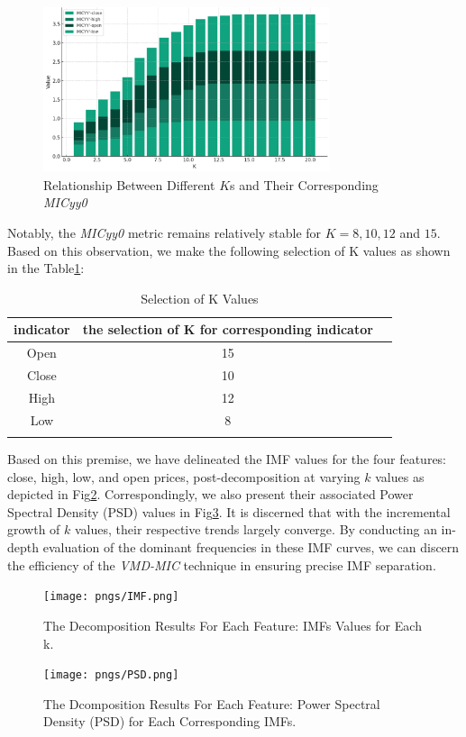 \documentclass[sn-mathphys,Numbered]{sn-jnl}
\theoremstyle{thmstyleone}%
\theoremstyle{thmstyletwo}%
\theoremstyle{thmstylethree}%
\begin{document}
\begin{figure}[h]
    \centering
    \includegraphics[width=0.75\textwidth]{pngs/MICYY.png}
    \caption{ Relationship Between Different $K$s and Their Corresponding \textit{MICyy0}}
    \label{MICYY}
\end{figure}


Notably, the \textit{MICyy0} metric remains relatively stable for \( K = 8, 10, 12 \) and \( 15 \). Based on this observation, we make the following selection of K values as shown in the Table\ref{tab_3}:

\begin{table}[h]
\caption{Selection of K Values}\label{tab_3}%
\begin{tabular}{@{}ccc@{}}
\toprule
indicator & the selection of K for corresponding indicator  \\
\midrule
Open      & 15    \\
Close    & 10    \\
High        & 12    \\
Low      & 8    \\
\botrule
\end{tabular}
\end{table}


Based on this premise, we have delineated the IMF values for the four features: close, high, low, and open prices, post-decomposition at varying \( k \) values as depicted in Fig\ref{IMF}. Correspondingly, we also present their associated Power Spectral Density (PSD) values in Fig\ref{PSD}. It is discerned that with the incremental growth of \( k \) values, their respective trends largely converge. By conducting an in-depth evaluation of the dominant frequencies in these IMF curves, we can discern the efficiency of the \textit{VMD-MIC} technique in ensuring precise IMF separation.

\begin{figure}[h]
    \centering
    \texttt{[image: pngs/IMF.png]}
    \caption{ The Decomposition Results For Each Feature: IMFs Values for Each k.}
    \label{IMF}
\end{figure}
\begin{figure}[h]
    \centering
    \texttt{[image: pngs/PSD.png]}
    \caption{ The Dcomposition Results For Each Feature: Power Spectral Density (PSD) for Each Corresponding IMFs.}
    \label{PSD}
\end{figure}
\end{document}
